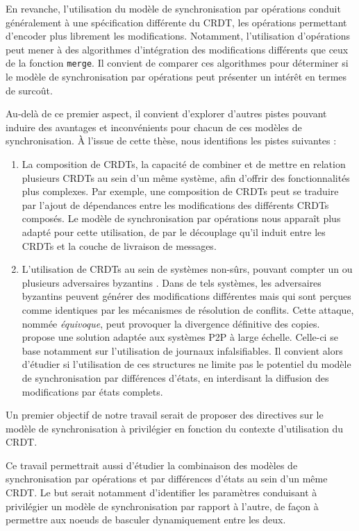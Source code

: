 En revanche, l'utilisation du modèle de synchronisation par opérations conduit généralement à une spécification différente du \ac{CRDT}, les opérations permettant d'encoder plus librement les modifications.
Notamment, l'utilisation d'opérations peut mener à des algorithmes d'intégration des modifications différents que ceux de la fonction \texttt{merge}.
Il convient de comparer ces algorithmes pour déterminer si le modèle de synchronisation par opérations peut présenter un intérêt en termes de surcoût.

Au-delà de ce premier aspect, il convient d'explorer d'autres pistes pouvant induire des avantages et inconvénients pour chacun de ces modèles de synchronisation.
À l'issue de cette thèse, nous identifions les pistes suivantes :
\begin{enumerate}
    \item La composition de \acp{CRDT}, \ie la capacité de combiner et de mettre en relation plusieurs \acp{CRDT} au sein d'un même système, afin d'offrir des fonctionnalités plus complexes.
        Par exemple, une composition de \acp{CRDT} peut se traduire par l'ajout de dépendances entre les modifications des différents \acp{CRDT} composés.
        Le modèle de synchronisation par opérations nous apparaît plus adapté pour cette utilisation, de par le découplage qu'il induit entre les \acp{CRDT} et la couche de livraison de messages.

    \item L'utilisation de \acp{CRDT} au sein de systèmes non-sûrs, \ie pouvant compter un ou plusieurs adversaires byzantins \cite{2019-byzantine-generals-problem-lamport}.
        Dans de tels systèmes, les adversaires byzantins peuvent générer des modifications différentes mais qui sont perçues comme identiques par les mécanismes de résolution de conflits.
        Cette attaque, nommée \emph{équivoque}, peut provoquer la divergence définitive des copies.
        \cite{2018-prunable-authenticated-log-vic} propose une solution adaptée aux systèmes \ac{P2P} à large échelle.
        Celle-ci se base notamment sur l'utilisation de journaux infalsifiables.
        Il convient alors d'étudier si l'utilisation de ces structures ne limite pas le potentiel du modèle de synchronisation par différences d'états, \eg en interdisant la diffusion des modifications par états complets.
\end{enumerate}

Un premier objectif de notre travail serait de proposer des directives sur le modèle de synchronisation à privilégier en fonction du contexte d'utilisation du \ac{CRDT}.

Ce travail permettrait aussi d'étudier la combinaison des modèles de synchronisation par opérations et par différences d'états au sein d'un même \ac{CRDT}.
Le but serait notamment d'identifier les paramètres conduisant à privilégier un modèle de synchronisation par rapport à l'autre, de façon à permettre aux noeuds de basculer dynamiquement entre les deux.
